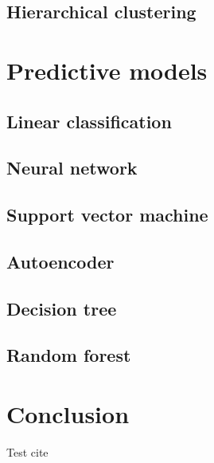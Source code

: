 \documentclass[a4paper, twoside,openright]{report}
\begin{document}
\subsection{Hierarchical clustering}

\section{Predictive models}

\subsection{Linear classification}

\subsection{Neural network}

\subsection{Support vector machine}

\subsection{Autoencoder}

\subsection{Decision tree}

\subsection{Random forest}

\section{Conclusion}
Test cite\cite{test_cite}



\end{document}
